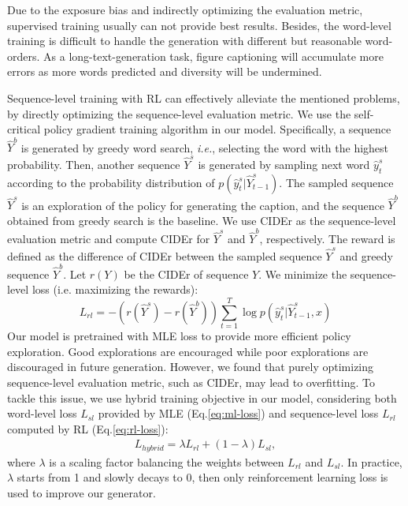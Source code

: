 \documentclass[11pt,a4paper]{article}
\begin{document}
Due to the exposure bias and indirectly optimizing the evaluation metric, supervised training usually can not provide best results. Besides, the word-level training is difficult to handle the generation with different but reasonable word-orders. As a long-text-generation task, figure captioning will accumulate more errors as more words predicted and diversity will be undermined. 

Sequence-level training with RL can effectively alleviate the mentioned problems, by directly optimizing the sequence-level evaluation metric. We use the self-critical policy gradient training algorithm in our model. Specifically, a sequence $\hat{Y}^b$ is generated by greedy word search, \emph{i.e.}, selecting the word with the highest probability. Then, another sequence $\hat{Y}^s$ is generated by sampling next word $\hat{y}^s_t$ according to the probability distribution of $p(\hat{y}^s_t|\hat{Y}^s_{t-1})$. 
The sampled sequence $\hat{Y}^s$ is an exploration of the policy for generating the caption, and the sequence $\hat{Y}^b$ obtained from greedy search is the baseline. We use CIDEr as the sequence-level evaluation metric and compute CIDEr for $\hat{Y}^s$ and $\hat{Y}^b$, respectively. The reward is defined as the difference of CIDEr between the sampled sequence $\hat{Y}^s$ and greedy sequence $\hat{Y}^b$. Let $r(Y)$ be the CIDEr of sequence $Y$. We minimize the sequence-level loss (i.e. maximizing the rewards):
\begin{equation}
L_{rl} = -(r(\hat{Y}^s) - r(\hat{Y}^b)) \sum_{t=1}^{T} \log p(\hat{y}^s_t | \hat{Y}^s_{t-1}, x)
\label{eq:rl-loss}
\end{equation}
Our model is pretrained with MLE loss to provide more efficient policy exploration. Good explorations are encouraged while poor explorations are discouraged in future generation. However, we found that purely optimizing sequence-level evaluation metric, such as CIDEr, may lead to overfitting. To tackle this issue, we use hybrid training objective in our model, considering both word-level loss $L_{sl}$ provided by MLE (Eq.\ref{eq:ml-loss}) and sequence-level loss $L_{rl}$ computed by RL (Eq.\ref{eq:rl-loss}):
\begin{align}
L_{hybrid} = \lambda L_{rl} + (1 - \lambda) L_{sl},
\label{eq:mixed-loss}
\end{align}
where $\lambda$ is a scaling factor balancing the weights between $L_{rl}$ and $L_{sl}$. In practice, $\lambda$ starts from 1 and slowly decays to 0, then only reinforcement learning loss is used to improve our generator. 
\end{document}
